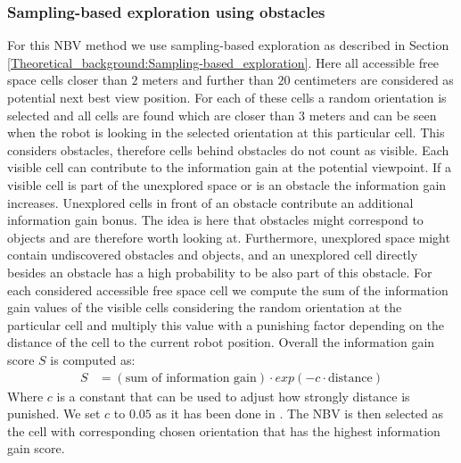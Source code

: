 \documentclass[a4paper,11pt,english]{article}
\begin{document}
\subsubsection{Sampling-based exploration using obstacles}
For this NBV method we use sampling-based exploration as described in Section \ref{Theoretical_background:Sampling-based_exploration}.
Here all accessible free space cells closer than $2$ meters and further than $20$ centimeters are considered as potential next best view position.
For each of these cells a random orientation is selected and all cells are found which are closer than $3$ meters and can be seen when the robot is looking in the selected orientation at this particular cell. This considers obstacles, therefore cells behind obstacles do not count as visible. %
Each visible cell can contribute to the information gain at the potential viewpoint.
If a visible cell is part of the unexplored space or is an obstacle the information gain increases. Unexplored cells in front of an obstacle contribute an additional information gain bonus.
The idea is here that obstacles might correspond to objects and are therefore worth looking at.
Furthermore, unexplored space might contain undiscovered obstacles and objects, and an unexplored cell directly besides an obstacle has a high probability to be also part of this obstacle.
For each considered accessible free space cell we compute the sum of the information gain values of the visible cells considering the random orientation at the particular cell and multiply this value with a punishing factor depending on the distance of the cell to the current robot position.
Overall the information gain score $S$ is computed as:
\begin{align*}
 S &= (\mbox{sum of information gain})\cdot exp(-c\cdot \mbox{distance})
\end{align*}
Where $c$ is a constant that can be used to adjust how strongly distance is punished. We set $c$ to $0.05$ as it has been done in \cite{surmann2003autonomous}.
The NBV is then selected as the cell with corresponding chosen orientation that has the highest information gain score.
\end{document}
